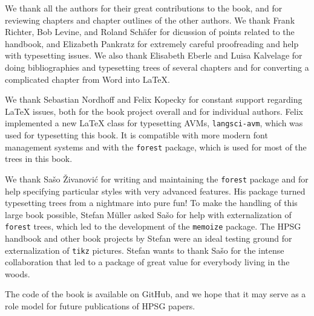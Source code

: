 \begin{refsection}
We thank all the authors for their great contributions to the book, and for
reviewing chapters and chapter outlines of the other authors. We thank
Frank Richter, Bob Levine, and Roland Schäfer for dicussion of points related to the handbook, and
Elizabeth Pankratz for extremely careful proofreading and help with typesetting issues. We also
thank Elisabeth Eberle and Luisa Kalvelage for doing bibliographies and typesetting trees of several
chapters and for converting a complicated chapter from Word into \LaTeX.

We thank Sebastian Nordhoff and Felix Kopecky for constant support regarding \LaTeX{} issues, both for
the book project overall and for individual authors. Felix implemented a new \LaTeX{} class for
typesetting AVMs, \texttt{langsci-avm}, which was used for typesetting this book. It is compatible with more
modern font management systems and with the \texttt{forest} package, which is used for most of the trees in this book.

We thank Sašo Živanović for writing and maintaining the \texttt{forest} package and for help
specifying particular styles with very advanced features. His package turned typesetting trees from a
nightmare into pure fun! To make the handling of this large book possible, Stefan Müller asked Sašo
for help with externalization of \texttt{forest} trees, which led to the development of
the \texttt{memoize} package. The HPSG handbook and other book projects by Stefan were an
ideal testing ground for externalization of \texttt{tikz} pictures. Stefan wants to thank
Sašo for the intense collaboration that led to a package of great value for everybody
living in the woods.

The code of the book is available on GitHub, and we hope that it may serve as a role model for future
publications of HPSG papers.


\printbibliography[heading=subbibliography]
\end{refsection}

